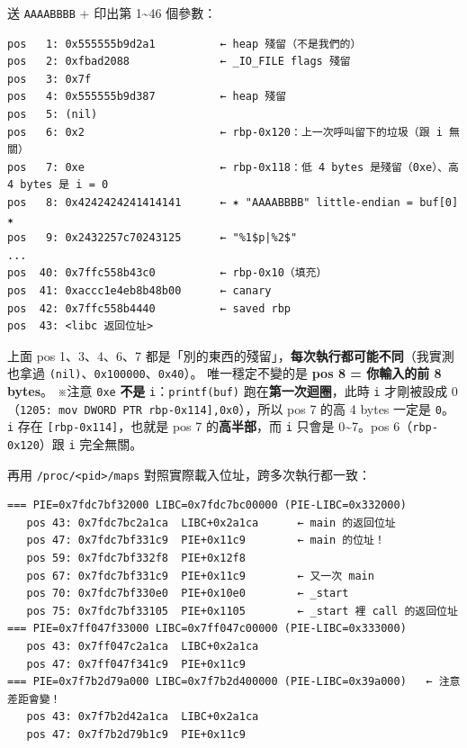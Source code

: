 \documentclass[10pt,a4paper]{article}
\renewenvironment{quote}{%
  \begin{mdframed}[linewidth=0pt,innerleftmargin=0pt,innerrightmargin=0pt,
    innerbottommargin=0pt,innertopmargin=0pt,skipabove=0.55em,skipbelow=0.55em,
    leftmargin=0.9em,rightmargin=0.4em,startcode={\color{quotebar}\vrule width 2.6pt},%
    endcode={}]%
  \itshape\color{black}%
}{%
  \end{mdframed}%
}
\begin{document}
送 \texttt{AAAABBBB} + 印出第 1\textasciitilde46 個參數：

\begin{Verbatim}[breaklines=true,breakanywhere=true,breakautoindent=false,fontsize=\fontsize{7.0}{9.5}\selectfont]
pos   1: 0x555555b9d2a1          ← heap 殘留（不是我們的）
pos   2: 0xfbad2088              ← _IO_FILE flags 殘留
pos   3: 0x7f
pos   4: 0x555555b9d387          ← heap 殘留
pos   5: (nil)
pos   6: 0x2                     ← rbp-0x120：上一次呼叫留下的垃圾（跟 i 無關）
pos   7: 0xe                     ← rbp-0x118：低 4 bytes 是殘留（0xe）、高 4 bytes 是 i = 0
pos   8: 0x4242424241414141      ← ✶ "AAAABBBB" little-endian = buf[0] ✶
pos   9: 0x2432257c70243125      ← "%1$p|%2$"
...
pos  40: 0x7ffc558b43c0          ← rbp-0x10（填充）
pos  41: 0xaccc1e4eb8b48b00      ← canary
pos  42: 0x7ffc558b4440          ← saved rbp
pos  43: <libc 返回位址>
\end{Verbatim}

\begin{quote}
上面 pos 1、3、4、6、7
都是「別的東西的殘留」，\textbf{每次執行都可能不同}（我實測也拿過
\texttt{(nil)}、\texttt{0x100000}、\texttt{0x40}）。 唯一穩定不變的是
\textbf{pos 8 = 你輸入的前 8 bytes}。 ※注意 \texttt{0xe} \textbf{不是}
\texttt{i}：\texttt{printf(buf)} 跑在\textbf{第一次迴圈}，此時
\texttt{i} 才剛被設成 0
（\texttt{1205:\allowbreak{}\ \allowbreak{}mov\ \allowbreak{}DWORD\ \allowbreak{}PTR\ \allowbreak{}{[}rbp-\allowbreak{}0x114{]},\allowbreak{}0x0}），所以 pos 7
的高 4 bytes 一定是 \texttt{0}。 \texttt{i} 存在
\texttt{{[}rbp-\allowbreak{}0x114{]}}，也就是 pos 7 的\textbf{高半部}，而 \texttt{i}
只會是 0\textasciitilde7。pos 6（\texttt{rbp-\allowbreak{}0x120}）跟 \texttt{i}
完全無關。
\end{quote}

再用 \texttt{/\allowbreak{}proc/\allowbreak{}\textless{}\allowbreak{}pid\textgreater{}\allowbreak{}/\allowbreak{}maps}
對照實際載入位址，跨多次執行都一致：

\begin{Verbatim}[breaklines=true,breakanywhere=true,breakautoindent=false,fontsize=\fontsize{7.0}{9.5}\selectfont]
=== PIE=0x7fdc7bf32000 LIBC=0x7fdc7bc00000 (PIE-LIBC=0x332000)
   pos 43: 0x7fdc7bc2a1ca  LIBC+0x2a1ca      ← main 的返回位址
   pos 47: 0x7fdc7bf331c9  PIE+0x11c9        ← main 的位址！
   pos 59: 0x7fdc7bf332f8  PIE+0x12f8
   pos 67: 0x7fdc7bf331c9  PIE+0x11c9        ← 又一次 main
   pos 70: 0x7fdc7bf330e0  PIE+0x10e0        ← _start
   pos 75: 0x7fdc7bf33105  PIE+0x1105        ← _start 裡 call 的返回位址
=== PIE=0x7ff047f33000 LIBC=0x7ff047c00000 (PIE-LIBC=0x333000)
   pos 43: 0x7ff047c2a1ca  LIBC+0x2a1ca
   pos 47: 0x7ff047f341c9  PIE+0x11c9
=== PIE=0x7f7b2d79a000 LIBC=0x7f7b2d400000 (PIE-LIBC=0x39a000)   ← 注意差距會變！
   pos 43: 0x7f7b2d42a1ca  LIBC+0x2a1ca
   pos 47: 0x7f7b2d79b1c9  PIE+0x11c9
\end{Verbatim}
\end{document}
